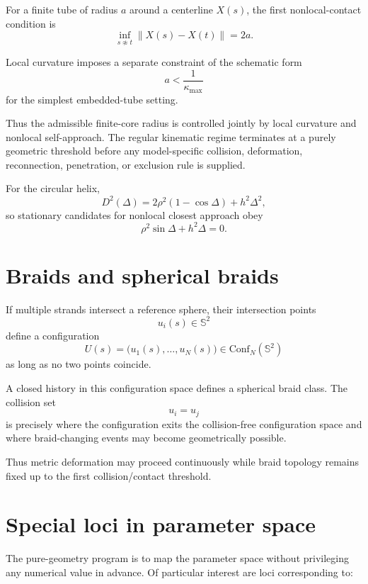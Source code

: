 \documentclass[11pt]{article}
\newcommand{\Conf}{\mathrm{Conf}}
\newcommand{\Sph}{\mathbb{S}}
\begin{document}
For a finite tube of radius $a$ around a centerline $X(s)$, the first
nonlocal-contact condition is
\[
\inf_{s\not\approx t}\|X(s)-X(t)\|=2a.
\]

Local curvature imposes a separate constraint of the schematic form
\[
a<\frac{1}{\kappa_{\max}}
\]
for the simplest embedded-tube setting.

Thus the admissible finite-core radius is controlled jointly by local curvature
and nonlocal self-approach.  The regular kinematic regime terminates at a purely
geometric threshold before any model-specific collision, deformation,
reconnection, penetration, or exclusion rule is supplied.

For the circular helix,
\[
D^2(\Delta)
=
2\rho^2(1-\cos\Delta)+h^2\Delta^2,
\]
so stationary candidates for nonlocal closest approach obey
\[
\rho^2\sin\Delta+h^2\Delta=0.
\]

\section{Braids and spherical braids}

If multiple strands intersect a reference sphere, their intersection points
\[
u_i(s)\in\Sph^2
\]
define a configuration
\[
U(s)=\bigl(u_1(s),\ldots,u_N(s)\bigr)
\in \Conf_N(\Sph^2)
\]
as long as no two points coincide.

A closed history in this configuration space defines a spherical braid class.
The collision set
\[
u_i=u_j
\]
is precisely where the configuration exits the collision-free configuration
space and where braid-changing events may become geometrically possible.

Thus metric deformation may proceed continuously while braid topology remains
fixed up to the first collision/contact threshold.

\section{Special loci in parameter space}

The pure-geometry program is to map the parameter space without privileging any
numerical value in advance.  Of particular interest are loci corresponding to:
\end{document}
